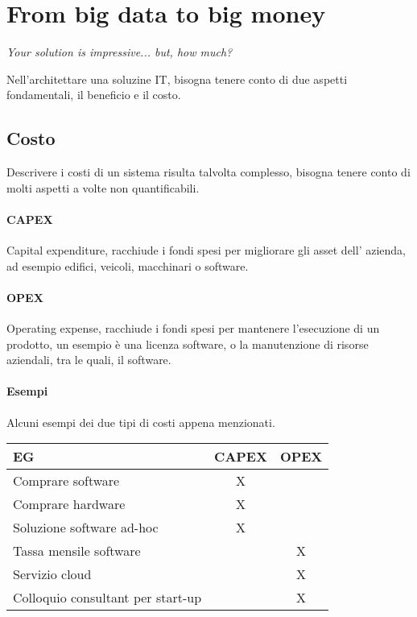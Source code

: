 \section{From big data to big money}
\begin{center}
    \emph{Your solution is impressive... but, how much?}
\end{center}
Nell'architettare una soluzine IT, bisogna tenere conto di due 
aspetti fondamentali, il beneficio e il costo.

\subsection{Costo}
Descrivere i costi di un sistema risulta talvolta complesso, 
bisogna tenere conto di molti aspetti a volte non quantificabili.

\paragraph{CAPEX}
Capital expenditure, racchiude i fondi spesi per migliorare gli asset dell'
azienda, ad esempio edifici, veicoli, macchinari o software.

\paragraph{OPEX}
Operating expense, racchiude i fondi spesi per mantenere l'esecuzione di un prodotto, 
un esempio è una licenza software, o la manutenzione di risorse aziendali, tra 
le quali, il software.

\paragraph{Esempi}
Alcuni esempi dei due tipi di costi appena menzionati.
\begin{center}
    \begin{tabular}{lcc} 
    \toprule
        EG & CAPEX & OPEX \\
    \midrule
        Comprare software & X &  \\ 
        Comprare hardware & X &  \\
        Soluzione software ad-hoc  & X &  \\
        Tassa mensile software &   & X \\
        Servizio cloud &   & X \\
        Colloquio consultant per start-up &   & X \\
    \bottomrule
   \end{tabular}
\end{center}

